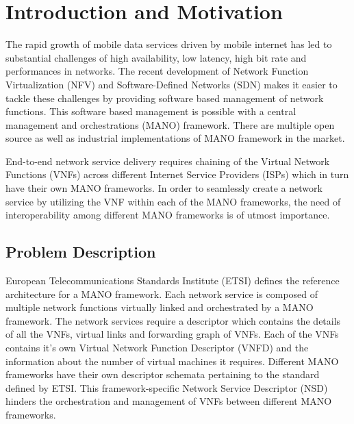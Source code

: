 \newcommand{\comment}[1]{}
\chapter{Introduction and Motivation}
\label{ch:Motivation}
\comment{
The rapid growth of mobile data services driven by mobile internet has led to substantial challenges of high availability, low latency, high bit rate and performances in networks. The recent development of Network Function Virtualization (NFV) and Software-Defined Networks (SDN) have emerged as key enablers for 5G networks. 
There has been a paradigm shift in networking with the recent developments in network virtualization technology. NFV involves decoupling of the hardware components from the software components of a network function. NFV requires a central management and orchestrations (MANO) framework in order to fully deliver end-to-end services of an application. There are multiple open source as well as industrial implementations of MANO framework in the market. }

The rapid growth of mobile data services driven by mobile internet has led to substantial challenges of high availability, low latency, high bit rate and performances in networks. The recent development of Network Function Virtualization (NFV) and Software-Defined Networks (SDN) makes it easier to tackle these challenges by providing software based management of network functions. This software based management is possible with a central management and orchestrations (MANO) framework. There are multiple open source as well as industrial implementations of MANO framework in the market.

End-to-end network service delivery requires chaining of the Virtual Network Functions (VNFs) across different Internet Service Providers (ISPs) which in turn have their own MANO frameworks. In order to seamlessly create a network service by utilizing the VNF within each of the MANO frameworks, the need of interoperability among different MANO frameworks is of utmost importance.


\section{Problem Description}

European Telecommunications Standards Institute (ETSI) defines the reference architecture for a MANO framework. Each network service is composed of multiple network functions virtually linked and orchestrated by a MANO framework. The network services require a descriptor which contains the details of all the VNFs, virtual links and forwarding graph of VNFs. Each of the VNFs contains it's own Virtual Network Function Descriptor (VNFD) and the information about the number of virtual machines it requires. Different MANO frameworks have their own descriptor schemata pertaining to the standard defined by ETSI. This framework-specific Network Service Descriptor (NSD) hinders the orchestration and management of VNFs between different MANO frameworks. 

